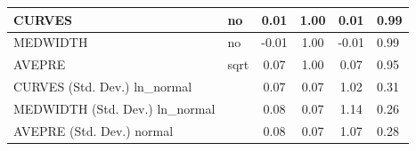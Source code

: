 \begin{table}
\begin{center}
\begin{tabular}{|l|l|c|c|c|l|}
			\hline
			CURVES & no & 0.01 & 1.00 & 0.01 & 0.99 \\
			\hline
			MEDWIDTH & no & -0.01 & 1.00 & -0.01 & 0.99 \\
			\hline
			AVEPRE & sqrt & 0.07 & 1.00 & 0.07 & 0.95 \\
			\hline
			CURVES (Std. Dev.) ln_normal &  & 0.07 & 0.07 & 1.02 & 0.31 \\
			\hline
			MEDWIDTH (Std. Dev.) ln_normal &  & 0.08 & 0.07 & 1.14 & 0.26 \\
			\hline
			AVEPRE (Std. Dev.) normal &  & 0.08 & 0.07 & 1.07 & 0.28 \\
			\hline
		\end{tabular}
	\end{center}
\end{table}